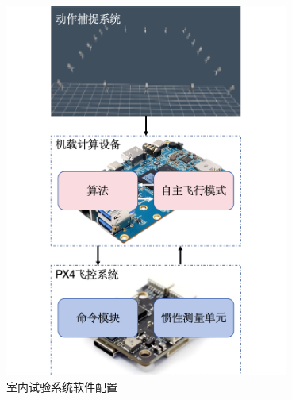 \documentclass[lang=chs, degree=master, blindreview=true, winfonts=true]{yanputhesis}
\begin{document}
\begin{figure}[hbt!]
	\centering
	\hspace{-1.1cm}
	\includegraphics[width=22pc]{picture/5_10.png} 
	\caption{室内试验系统软件配置} 
	\label{framewor}
\end{figure}




\end{document}
